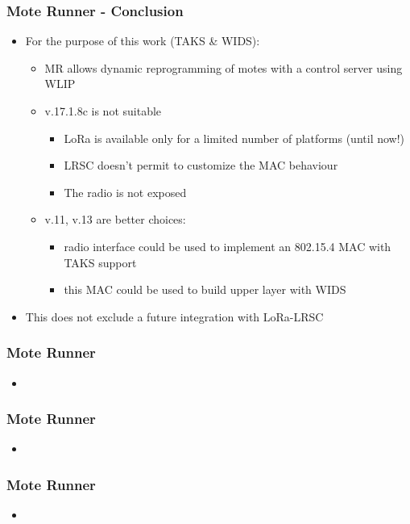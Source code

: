 \documentclass[12pt, compress]{beamer}
\begin{document}
\begin{frame}[fragile]
  \frametitle{Mote Runner - Conclusion}
  \vspace{-1em}
  \begin{itemize}
    \item For the purpose of this work (TAKS \& WIDS):
    \begin{itemize}
    	\item MR allows dynamic reprogramming of motes with a control server using WLIP
    	\item v.17.1.8c is not suitable
    	\begin{itemize}
	  \item LoRa is available only for a limited number of platforms (until now!)
	  \item LRSC doesn’t permit to customize the MAC behaviour
	  \item The radio is not exposed
    	\end{itemize}
    	\item v.11, v.13 are better choices:
    	\begin{itemize}
	  \item radio interface could be used to implement an 802.15.4 MAC with TAKS support
	  \item this MAC could be used to build upper layer with WIDS
    	\end{itemize}
    \end{itemize}
    \item This does not exclude a future integration with LoRa-LRSC
  \end{itemize}
\end{frame}

\begin{frame}[fragile]
  \frametitle{Mote Runner}
  \begin{itemize}
  	\item 
  \end{itemize}
\end{frame}

\begin{frame}[fragile]
  \frametitle{Mote Runner}
  \begin{itemize}
  	\item 
  \end{itemize}
\end{frame}

\begin{frame}[fragile]
  \frametitle{Mote Runner}
  \begin{itemize}
  	\item 
  \end{itemize}
\end{frame}
\end{document}
